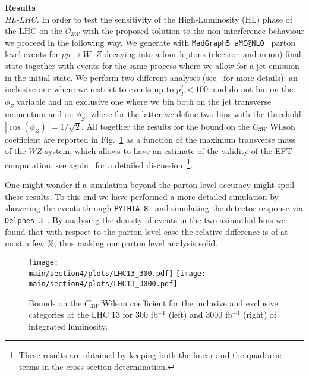 \noindent
{\bf Results}\\
\emph{HL-LHC.} In order to test the sensitivity of the High-Luminosity (HL) phase of the LHC on the $\mathcal{O}_{3W}$ with the proposed solution to the non-interference behaviour we proceed in the following way. We generate with {\tt MadGraph5 aMC@NLO}~\cite{Alwall:2014hca} parton level events for $pp \to W^{\pm} Z $ decaying into a four leptons (electron and muon) final state together with events for the same process where we allow for a jet emission in the initial state. We perform two different analyses (see~\cite{Azatov:2017kzw} for more details): an inclusive one where we restrict to events up to $p_T^j<100\;$ \UGeV and do not bin on the $\phi_Z$ variable and an exclusive one where we bin both on the jet transverse momentum and on $\phi_Z$, where for the latter we define two bins with the threshold $|\cos(\phi_Z)|=1/\sqrt{2}$. All together the results for the bound on the $C_{3W}$ Wilson coefficient are reported in Fig.~\ref{fig:LHC13} as a function of the maximum transverse mass of the $WZ$ system, which allows to have an estimate of the validity of the EFT computation, see again~\cite{Azatov:2017kzw} for a detailed discussion~\footnote{These results are obtained by keeping both the linear and the quadratic terms in the cross section determination.}.

One might wonder if a simulation beyond the parton level accuracy might spoil these results. To this end we have performed a more detailed simulation by showering the events through {\tt PYTHIA 8}~\cite{Alwall:2014hca} and simulating the detector response via {\tt Delphes 3}~\cite{deFavereau:2013fsa}. By analysing the density of events in the two azimuthal bins we found that with respect to the parton level case the relative difference is of at most a few \%, thus making our parton level analysis solid.


  
  \begin{figure}[ht]
\begin{center}
 \texttt{[image: \\main/section4/plots/LHC13\_300.pdf]}{}\hspace{2cm}
 \texttt{[image: \\main/section4/plots/LHC13\_3000.pdf]}{}
\end{center}
\caption{Bounds on the $C_{3W}$ Wilson coefficient for the inclusive and exclusive categories at the LHC 13 for 300 fb$^{-1}$ (left) and 3000 fb$^{-1}$ (right) of integrated luminosity.}
\label{fig:LHC13}
\end{figure}


